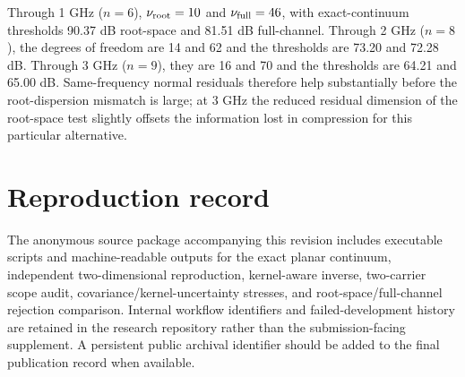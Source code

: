 \documentclass[aps,pra,onecolumn,superscriptaddress,nofootinbib]{revtex4-2}
\begin{document}
Through 1 GHz ($n=6$), $\nu_{\rm root}=10$ and $\nu_{\rm full}=46$, with exact-continuum thresholds 90.37 dB root-space and 81.51 dB full-channel. Through 2 GHz ($n=8$), the degrees of freedom are 14 and 62 and the thresholds are 73.20 and 72.28 dB. Through 3 GHz ($n=9$), they are 16 and 70 and the thresholds are 64.21 and 65.00 dB. Same-frequency normal residuals therefore help substantially before the root-dispersion mismatch is large; at 3 GHz the reduced residual dimension of the root-space test slightly offsets the information lost in compression for this particular alternative.

\section{Reproduction record}

The anonymous source package accompanying this revision includes executable scripts and machine-readable outputs for the exact planar continuum, independent two-dimensional reproduction, kernel-aware inverse, two-carrier scope audit, covariance/kernel-uncertainty stresses, and root-space/full-channel rejection comparison. Internal workflow identifiers and failed-development history are retained in the research repository rather than the submission-facing supplement. A persistent public archival identifier should be added to the final publication record when available.



\end{document}
